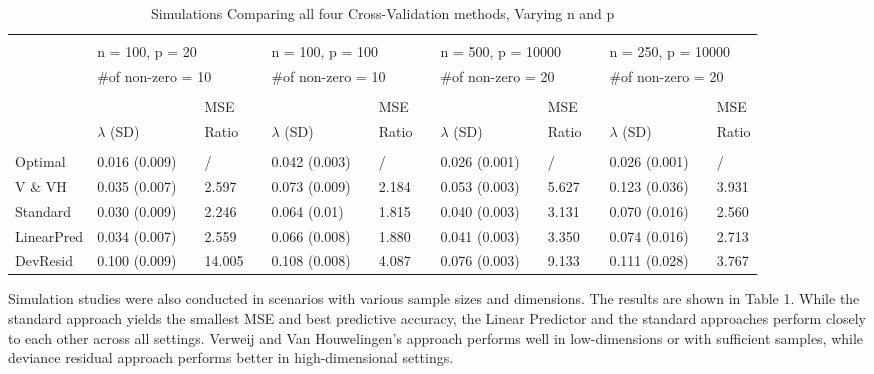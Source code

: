 \begin{table}[h]
	\small
	\centering
	\caption{Simulations Comparing all four Cross-Validation methods, Varying n and p}
	\begin{tabular}{llllllllllllllll}
	\hline\\[-0.75em]
       	& \multicolumn{3}{l}{n = 100, p = 20} &  & \multicolumn{3}{l}{n = 100, p = 100} &  & \multicolumn{3}{l}{n = 500, p = 10000} &  & \multicolumn{3}{l}{n = 250, p = 10000} \\
       	& \multicolumn{3}{l}{$\#$of non-zero = 10} &  & \multicolumn{3}{l}{$\#$of non-zero = 10} &  & \multicolumn{3}{l}{$\#$of non-zero = 20} &  & \multicolumn{3}{l}{$\#$of non-zero = 20} \\ \cline{2-4} \cline{6-8} \cline{10-12} \cline{14-16} 
	\hline\\[-0.75em]
       	& & & MSE & & & & MSE & & & & MSE & & & & MSE \\
       	& $\lambda$ (SD) & & Ratio & & $\lambda$ (SD) & & Ratio & &	$\lambda$ (SD) & & Ratio & & $\lambda$ (SD) & & Ratio      
	\\ 
	\cline{2-2} \cline{4-4} \cline{6-6} \cline{8-8} \cline{10-10} \cline{12-12} \cline{14-14} \cline{16-16} 
	\\[-0.75em]
	Optimal &0.016 (0.009)&&/&&0.042 (0.003)&&/&&0.026 (0.001)&&/&&0.026 (0.001)&&/\\          
	V $\&$ VH &0.035 (0.007)&&2.597&&0.073 (0.009)&&2.184&&0.053 (0.003)&&5.627&&0.123 (0.036)&&3.931\\
	Standard &0.030 (0.009)&&2.246&&0.064 (0.01)&&1.815&&0.040 (0.003)&&3.131&&0.070 (0.016)&&2.560\\
	LinearPred &0.034 (0.007)&&2.559&&0.066 (0.008)&&1.880&&0.041 (0.003)&&3.350&&0.074 (0.016)&&2.713\\
	DevResid &0.100 (0.009)&&14.005&&0.108 (0.008)&&4.087&&0.076 (0.003)&&9.133&&0.111 (0.028)&&3.767\\ 
	\hline
\end{tabular}
\end{table}

\par Simulation studies were also conducted in scenarios with various sample sizes and dimensions. The results are shown in Table 1. While the standard approach yields the smallest MSE and best predictive accuracy, the Linear Predictor and the standard approaches perform closely to each other across all settings. Verweij and Van Houwelingen's approach performs well in low-dimensions or with sufficient samples, while deviance residual approach performs better in high-dimensional settings.

